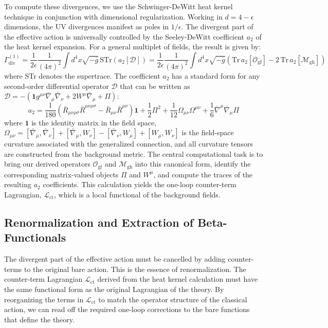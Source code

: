 \documentclass[twocolumn]{aastex631}
\begin{document}
To compute these divergences, we use the Schwinger-DeWitt heat kernel technique in conjunction with dimensional regularization. Working in $d=4-\epsilon$ dimensions, the UV divergences manifest as poles in $1/\epsilon$. The divergent part of the effective action is universally controlled by the Seeley-DeWitt coefficient $a_2$ of the heat kernel expansion. For a general multiplet of fields, the result is given by:
\begin{equation}
    \Gamma^{(1)}_{\text{div}} = \frac{1}{2\epsilon} \frac{1}{(4\pi)^2} \int d^4x \sqrt{-\bar{g}} \, \text{STr} \left( a_2[\mathcal{D}] \right) = \frac{1}{2\epsilon} \frac{1}{(4\pi)^2} \int d^4x \sqrt{-\bar{g}} \left( \text{Tr} \, a_2[\mathbf{\mathcal{O}}_{\text{gf}}] - 2 \, \text{Tr} \, a_2[\mathcal{M}_{\text{gh}}] \right)
\end{equation}
where STr denotes the supertrace. The coefficient $a_2$ has a standard form for any second-order differential operator $\mathcal{D}$ that can be written as $\mathcal{D} = -(\mathbf{1} g^{\mu\nu}\bar{\nabla}_\mu\bar{\nabla}_\nu + 2W^\mu\bar{\nabla}_\mu + \Pi)$:
\begin{equation}
    a_2 = \frac{1}{180} (\bar{R}_{\mu\nu\rho\sigma}\bar{R}^{\mu\nu\rho\sigma} - \bar{R}_{\mu\nu}\bar{R}^{\mu\nu}) \mathbf{1} + \frac{1}{2} \Pi^2 + \frac{1}{12} \Omega_{\mu\nu}\Omega^{\mu\nu} + \frac{1}{6} \bar{\nabla}^\mu\bar{\nabla}_\mu \Pi
\end{equation}
where $\mathbf{1}$ is the identity matrix in the field space, $\Omega_{\mu\nu} = [\bar{\nabla}_\mu, \bar{\nabla}_\nu] + [\bar{\nabla}_\mu, W_\nu] - [\bar{\nabla}_\nu, W_\mu] + [W_\mu, W_\nu]$ is the field-space curvature associated with the generalized connection, and all curvature tensors are constructed from the background metric. The central computational task is to bring our derived operators $\mathbf{\mathcal{O}}_{\text{gf}}$ and $\mathcal{M}_{\text{gh}}$ into this canonical form, identify the corresponding matrix-valued objects $\Pi$ and $W^\mu$, and compute the traces of the resulting $a_2$ coefficients. This calculation yields the one-loop counter-term Lagrangian, $\mathcal{L}_{\text{ct}}$, which is a local functional of the background fields.

\subsection{Renormalization and Extraction of Beta-Functionals}

The divergent part of the effective action must be cancelled by adding counter-terms to the original bare action. This is the essence of renormalization. The counter-term Lagrangian $\mathcal{L}_{\text{ct}}$ derived from the heat kernel calculation must have the same functional form as the original Lagrangian of the theory. By reorganizing the terms in $\mathcal{L}_{\text{ct}}$ to match the operator structure of the classical action, we can read off the required one-loop corrections to the bare functions that define the theory.
\end{document}
